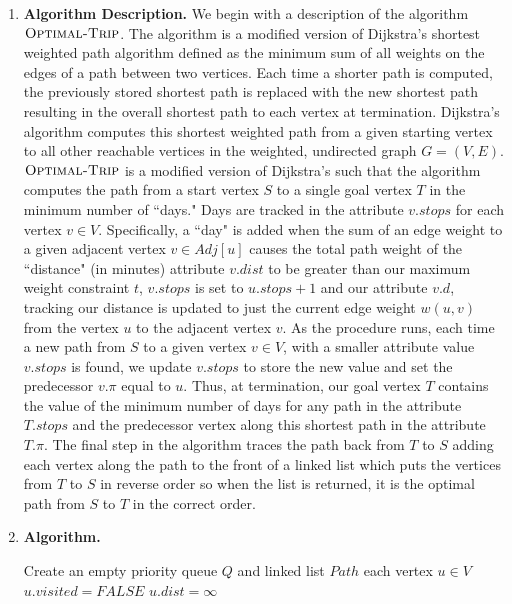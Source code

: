 \documentclass[11pt]{article}
\theoremstyle{nonumberplain}
\begin{document}
\begin{enumerate}
\item \textbf{Algorithm Description.} %
We begin with a description of the algorithm $\textnormal{\scshape Optimal-Trip}$. The algorithm is a modified version of Dijkstra's shortest weighted path algorithm defined as the minimum sum of all weights on the edges of a path between two vertices. Each time a shorter path is computed, the previously stored shortest path is replaced with the new shortest path resulting in the overall shortest path to each vertex at termination. Dijkstra's algorithm computes this shortest weighted path from a given starting vertex to all other reachable vertices in the weighted, undirected graph $G=(V,E)$. $\textnormal{\scshape Optimal-Trip}$ is a modified version of Dijkstra's such that the algorithm computes the path from a start vertex $S$ to a single goal vertex $T$ in the minimum number of ``days." Days are tracked in the attribute $v.stops$ for each vertex $v \in V$. Specifically, a ``day" is added when the sum of an edge weight to a given adjacent vertex $v \in Adj[u]$ causes the total path weight of the ``distance" (in minutes) attribute $v.dist$ to be greater than our maximum weight constraint $t$, $v.stops$ is set to $u.stops+1$ and our attribute $v.d$, tracking our distance is updated to just the current edge weight $w(u,v)$ from the vertex $u$ to the adjacent vertex $v$. As the procedure runs, each time a new path from $S$ to a given vertex $v \in V$, with a smaller attribute value $v.stops$ is found, we update $v.stops$ to store the new value and set the predecessor $v.\pi$ equal to $u$. Thus, at termination, our goal vertex $T$ contains the value of the minimum number of days for any path in the attribute $T.stops$ and the predecessor vertex along this shortest path in the attribute $T.\pi$. The final step in the algorithm traces the path back from $T$ to $S$ adding each vertex along the path to the front of a linked list which puts the vertices from $T$ to $S$ in reverse order so when the list is returned, it is the optimal path from $S$ to $T$ in the correct order.     
\newpage
\item \textbf{Algorithm.} %
\begin{codebox}
\li Create an empty priority queue $Q$ and linked list $Path$
\li \For each vertex $u \in V$ \Do
\li     $u.visited=FALSE$
\li     $u.dist=\infty$

\end{codebox}
\end{enumerate}
\end{document}
